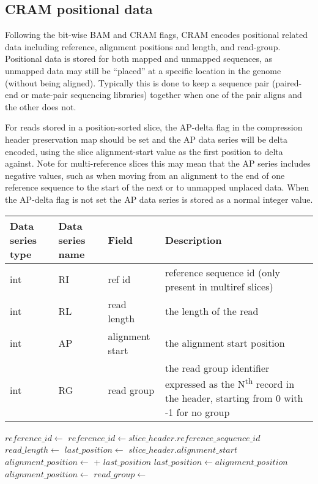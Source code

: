 \documentclass[a4paper]{article}
\begin{document}
\subsection{CRAM positional data}
\label{subsec:positions}

Following the bit-wise BAM and CRAM flags, CRAM encodes positional related data including reference, alignment positions and length, and read-group.
Positional data is stored for both mapped and unmapped sequences, as unmapped data may still be ``placed'' at a specific location in the genome (without being aligned).
Typically this is done to keep a sequence pair (paired-end or mate-pair sequencing libraries) together when one of the pair aligns and the other does not.

For reads stored in a position-sorted slice, the AP-delta flag in the compression header preservation map should be set and the AP data series will be delta encoded, using the slice alignment-start value as the first position to delta against.
Note for multi-reference slices this may mean that the AP series includes negative values, such as when moving from an alignment to the end of one reference sequence to the start of the next or to unmapped unplaced data.  When the AP-delta flag is not set the AP data series is stored as a normal integer value.

\begin{tabular}{|>{\raggedright}p{70pt}|>{\raggedright}p{75pt}|>{\raggedright}p{90pt}|>{\raggedright}p{171pt}|}
\hline
\textbf{Data series type} & \textbf{Data series name} & \textbf{Field} & \textbf{Description}\tabularnewline
\hline
int & RI & ref id & reference sequence id (only present in multiref slices)\tabularnewline
\hline
int & RL & read length & the length of the read\tabularnewline
\hline
int & AP & alignment start & the alignment start position\tabularnewline
\hline
int & RG & read group & the read group identifier expressed as the N\textsuperscript{th} record in the header, starting from 0 with -1 for no group\tabularnewline
\hline
\end{tabular}

\vskip 20pt
\begin{algorithmic}[1]
  \State $reference\_id\gets$ 
\Else
  \State $reference\_id\gets slice\_header.reference\_sequence\_id$
\EndIf
\State $read\_length \gets$ 
        \State $last\_position\gets$ $slice\_header.alignment\_start$
    \EndIf
    \State $alignment\_position \gets$  + $last\_position$
    \State $last\_position \gets alignment\_position$
\Else
    \State $alignment\_position \gets$ 
\EndIf
\State $read\_group \gets$ 
\EndProcedure
\end{algorithmic}
\end{document}
